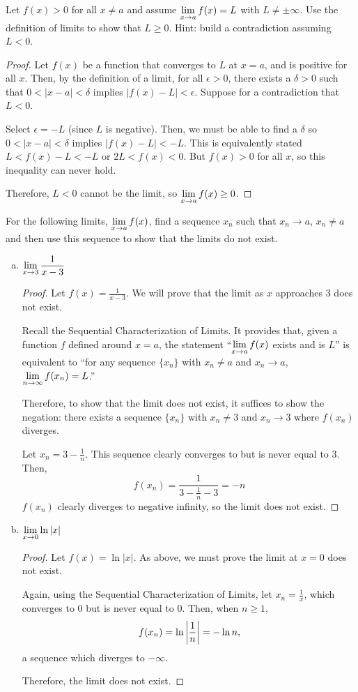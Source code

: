 \question Let $f(x) > 0$ for all $x \neq a$ and assume $\displaystyle\lim_{x\to a} f(x) = L$ with $L \neq \pm \infty$.
Use the definition of limits to show that $L \geq 0$.
Hint: build a contradiction assuming $L < 0$.
\begin{proof}
  Let $f(x)$ be a function that converges to $L$ at $x=a$, and is positive for all $x$.
  Then, by the \epsdel{} definition of a limit, for all $\epsilon > 0$,
  there exists a $\delta > 0$ such that $0 < |x-a| < \delta$ implies $|f(x) - L| < \epsilon$.
  Suppose for a contradiction that $L < 0$.

  Select $\epsilon = -L$ (since $L$ is negative).
  Then, we must be able to find a $\delta$ so $0 < |x-a| < \delta$ implies $|f(x)-L| < -L$.
  This is equivalently stated $L < f(x)-L < -L$ or $2L < f(x) < 0$.
  But $f(x) > 0$ for all $x$, so this inequality can never hold.

  Therefore, $L < 0$ cannot be the limit, so $\displaystyle\lim_{x\to a} f(x) \geq 0$.
\end{proof}


\question For the following limits, $\displaystyle\lim_{x\to a} f(x)$, find a sequence $x_n$ such that $x_n \to a$, $x_n \neq a$ and then use this sequence to show that the limits do not exist.
\begin{enumerate}[(a)]
  \item $\displaystyle\lim_{x\to3} \frac{1}{x-3}$
        \begin{proof}
          Let $f(x) = \frac{1}{x-3}$.
          We will prove that the limit as $x$ approaches 3 does not exist.

          Recall the Sequential Characterization of Limits.
          It provides that, given a function $f$ defined around $x=a$,
          the statement ``$\displaystyle\lim_{x\to a} f(x)$ exists and is $L$'' is equivalent to
          ``for any sequence $\{x_n\}$ with $x_n\neq a$ and $x_n \to a$, $\displaystyle\lim_{n\to\infty}f(x_n)=L$.''

          Therefore, to show that the limit does not exist, it suffices to show the negation:
          there exists a sequence $\{x_n\}$ with $x_n \neq 3$ and $x_n \to 3$ where $f(x_n)$ diverges.

          Let $x_n = 3-\frac{1}{n}$.
          This sequence clearly converges to but is never equal to 3.
          Then, \[ f(x_n) = \frac{1}{3-\frac{1}{n}-3} = -n \]
          $f(x_n)$ clearly diverges to negative infinity, so the limit does not exist.
        \end{proof}
  \item $\displaystyle\lim_{x\to0} \ln |x|$
        \begin{proof}
          Let $f(x) = \ln |x|$.
          As above, we must prove the limit at $x=0$ does not exist.

          Again, using the Sequential Characterization of Limits, let $x_n = \frac{1}{x}$,
          which converges to 0 but is never equal to 0.
          Then, when $n \geq 1$, \[ f(x_n) = \ln \abs{\frac{1}{n}} = -\ln n, \]
          a sequence which diverges to $-\infty$.

          Therefore, the limit does not exist.
        \end{proof}
\end{enumerate}

